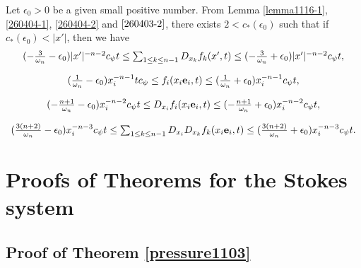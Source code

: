 \documentclass{amsart}
\numberwithin{equation}{section}
\newcommand{\ep}{{ \epsilon  }}
\newcommand{\om}{{ \omega  }}
\begin{document}
Let $ \ep_0 > 0$ be a given small positive number.    From Lemma \ref{lemma1116-1}, \eqref{260404-1}, \eqref{260404-2} and $\eqref{260403-2}$,  there exists $ 2< c_*(\ep_0) $ such that if  $ c_*(\ep_0) <|x'|$, then  we have 
\begin{align}\label{260323-5}
 \begin{array}{c}
 \vspace{4mm}          (  -\frac{3 }{\om_n} - \ep_0) |x'|^{-n-2} c_\psi  t\leq    \sum_{1 \leq k\leq n-1}   D_{x_k}  f_k  (x'  ,t)   
 \leq  (   -\frac{3 }{\om_n} + \ep_0) |x'|^{-n -2}   c_\psi t,  \\
\vspace{4mm}   (\frac1{\om_n} - \ep_0) x_i^{-n -1}t c_\psi \leq f_i (x_i {\bf e}_i,t)   \leq   (\frac1{\om_n} + \ep_0) x_i^{-n -1} c_\psi t,\\
\vspace{4mm}
  ( - \frac{n +1}{\om_n} - \ep_0) x_i^{-n -2} c_\psi  t\leq D_{x_i} f_i  (x_i {\bf e}_i,t)   \leq   (-   \frac{n+1}{\om_n} + \ep_0) x_i^{-n -2} c_\psi t,\\
       (  \frac{3(n+2)}{\om_n} - \ep_0) x_i^{-n -3} c_\psi  t\leq    \sum_{1 \leq k \leq n-1}  D_{x_i} D_{x_k}  f_k  (x_i {\bf e}_i ,t)   \leq   (   \frac{3(n+2)}{\om_n} + \ep_0) x_i^{-n-3}  c_\psi t.
 \end{array}
\end{align}




 
\section{Proofs of Theorems for the Stokes system}\label{SS-thms}
 

  \subsection{Proof of Theorem \ref{pressure1103}} %
  \setcounter{equation}{0}
  \label{mainsection}
 
\end{document}
